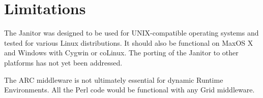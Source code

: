 
\section{Limitations}

The Janitor was designed to be used for UNIX-compatible operating systems
and tested for various Linux distributions. It should also be functional
on MaxOS X and Windows with Cygwin or coLinux.  The porting of the Janitor
to other platforms has not yet been addressed.

The ARC middleware is not ultimately essential for dynamic Runtime
Environments.  All the Perl code would be functional with any Grid
middleware.


